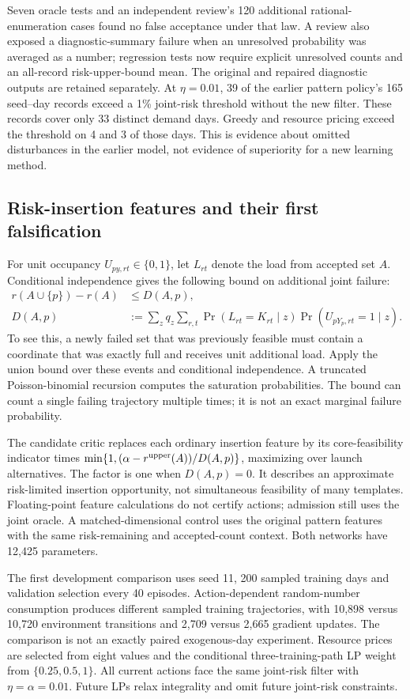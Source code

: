 \documentclass[11pt,a4paper]{article}
\begin{document}
Seven oracle tests and an independent review's 120 additional rational-enumeration cases found no false acceptance under that law. A review also exposed a diagnostic-summary failure when an unresolved probability was averaged as a number; regression tests now require explicit unresolved counts and an all-record risk-upper-bound mean. The original and repaired diagnostic outputs are retained separately. At $\eta=0.01$, 39 of the earlier pattern policy's 165 seed--day records exceed a 1\% joint-risk threshold without the new filter. These records cover only 33 distinct demand days. Greedy and resource pricing exceed the threshold on 4 and 3 of those days. This is evidence about omitted disturbances in the earlier model, not evidence of superiority for a new learning method.

\subsection{Risk-insertion features and their first falsification}
For unit occupancy $U_{py,rt}\in\{0,1\}$, let $L_{rt}$ denote the load from accepted set $A$. Conditional independence gives the following bound on additional joint failure:
\begin{align}
 r(A\cup\{p\})-r(A)&\leq D(A,p),\\
 D(A,p)&:=\sum_z q_z\sum_{r,t}
       \Pr(L_{rt}=K_{rt}\mid z)\Pr(U_{pY_p,rt}=1\mid z).
\end{align}
To see this, a newly failed set that was previously feasible must contain a coordinate that was exactly full and receives unit additional load. Apply the union bound over these events and conditional independence. A truncated Poisson-binomial recursion computes the saturation probabilities. The bound can count a single failing trajectory multiple times; it is not an exact marginal failure probability.

The candidate critic replaces each ordinary insertion feature by its core-feasibility indicator times $\min\{1,(\alpha-r^{\rm upper}(A))/D(A,p)\}$, maximizing over launch alternatives. The factor is one when $D(A,p)=0$. It describes an approximate risk-limited insertion opportunity, not simultaneous feasibility of many templates. Floating-point feature calculations do not certify actions; admission still uses the joint oracle. A matched-dimensional control uses the original pattern features with the same risk-remaining and accepted-count context. Both networks have 12,425 parameters.

The first development comparison uses seed 11, 200 sampled training days and validation selection every 40 episodes. Action-dependent random-number consumption produces different sampled training trajectories, with 10,898 versus 10,720 environment transitions and 2,709 versus 2,665 gradient updates. The comparison is not an exactly paired exogenous-day experiment. Resource prices are selected from eight values and the conditional three-training-path LP weight from $\{0.25,0.5,1\}$. All current actions face the same joint-risk filter with $\eta=\alpha=0.01$. Future LPs relax integrality and omit future joint-risk constraints.
\end{document}
